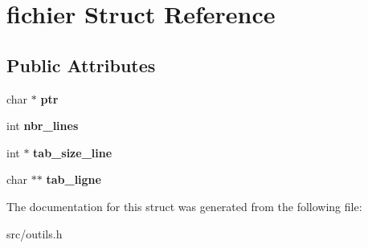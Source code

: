 \hypertarget{structfichier}{}\section{fichier Struct Reference}
\label{structfichier}
\subsection*{Public Attributes}
\begin{DoxyCompactItemize}
\item 
\mbox{\label{structfichier_a569e06bfd23afa16c1af5374a1f7d4cf}} 
char $\ast$ {\bfseries ptr}
\item 
\mbox{\label{structfichier_afa26ad05fd496adfb5c7094cfd70e44d}} 
int {\bfseries nbr\+\_\+lines}
\item 
\mbox{\label{structfichier_a3a07f98abefca3b78b4747c12d14eb80}} 
int $\ast$ {\bfseries tab\+\_\+size\+\_\+line}
\item 
\mbox{\label{structfichier_a3df4c0289a8cb15d7945c8d15d2bb279}} 
char $\ast$$\ast$ {\bfseries tab\+\_\+ligne}
\end{DoxyCompactItemize}


The documentation for this struct was generated from the following file\+:\begin{DoxyCompactItemize}
\item 
src/outils.\+h\end{DoxyCompactItemize}
